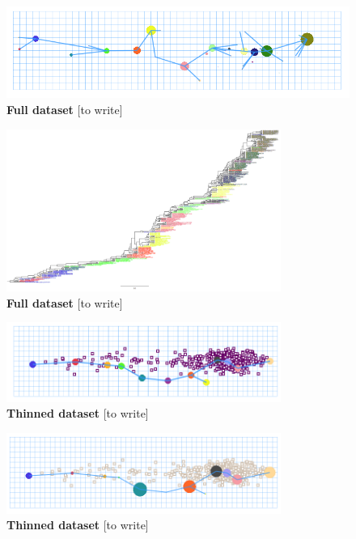 \documentclass[11pt,oneside,letterpaper]{article}
\begin{document}
\begin{figure}[h]
	\centering		
	\includegraphics[width=1\textwidth]{figures/fullData-MCC-Euclid-50M-proportional}
	\caption{\textbf{Full dataset} 
[to write]
	} 
	\label{MyLabel} 
\end{figure}

\begin{figure}[h]
	\centering		
	\includegraphics[width=0.8\textwidth]{figures/fullData-MCC-figTree-50M}
	\caption{\textbf{Full dataset} 
[to write]
	} 
	\label{MyLabel} 
\end{figure}


\newpage

\begin{figure}[h]
	\centering		
	\includegraphics[width=0.8\textwidth]{figures/thinnedData-MCC-Euclid-50M}
	\caption{\textbf{Thinned dataset} 
[to write]
	} 
	\label{MyLabel} 
\end{figure}

\begin{figure}[h]
	\centering		
	\includegraphics[width=0.8\textwidth]{figures/thinnedData-MCC-Euclid-50M-proportional}
	\caption{\textbf{Thinned dataset} 
[to write]
	} 
	\label{MyLabel} 
\end{figure}
\end{document}
